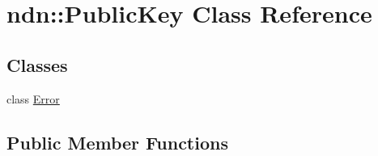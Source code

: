 \hypertarget{classndn_1_1PublicKey}{}\section{ndn\+:\+:Public\+Key Class Reference}
\label{classndn_1_1PublicKey}
\subsection*{Classes}
\begin{DoxyCompactItemize}
\item 
class \hyperlink{classndn_1_1PublicKey_1_1Error}{Error}
\end{DoxyCompactItemize}
\subsection*{Public Member Functions}
